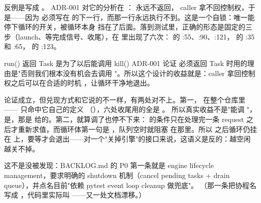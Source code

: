 反例是写成 。
ADR-001 对它的分析在 ： 永远不返回，
caller 拿不回控制权，于是——因为  必须写在
 的下一行，而那一行永远执行不到。这是一个自锁：唯一能停下循环的开关，被循环本身
挡在了后面。落到测试里，正确的形态是固定的三步（launch、等完成信号、收尾），在 
里出现了六次： 的 :55、:90、:121，
的 :35 和 :65， 的 :123。

\begin{misconception}{run() 返回 Task 是为了以后能调用 kill()}
ADR-001 论证  必须返回 Task 时用的理由是"否则我们根本没有机会去调用
"。所以这个设计的收益就是：caller 拿回控制权之后可以在合适的时机
，让循环干净地退出。
\end{misconception}

论证成立，但兑现方式和它说的不一样，有两处对不上。第一， 在整个仓库里—— 只命中它自己的定义
（），六处收尾用的全是 。
所以真实收益不是"能调 "，是，那是
 给的。第二，就算调了也停不下来： 的条件只在处理完一条
request 之后才重新求值，而循环体第一句是 ，队列空时就阻塞
在那里。所以  之后循环仍挂在  上，要等才会退出——对一个"关掉引擎"的接口来说，这语义是反的：越空闲越关不掉。

这不是没被发现：BACKLOG.md 的 P0 第一条就是 engine lifecycle management，要求明确的 shutdown
机制（cancel pending tasks + drain queue），并点名目前"依赖 pytest event loop cleanup 做兜底"。
（那一条把协程名写成 ，代码里实际叫
——又一处文档漂移。）

